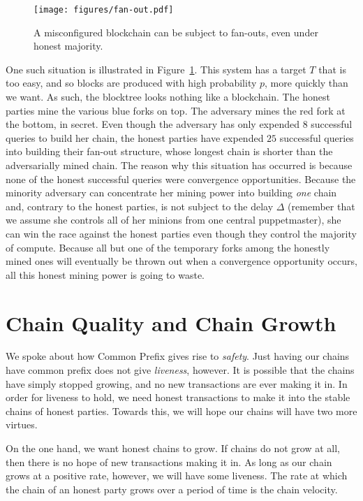 \begin{figure}[h]
    \centering
    \texttt{[image: figures/fan-out.pdf]}
    \caption{A misconfigured blockchain can be subject to fan-outs, even under honest majority.}
    \label{fig.fan-out}
\end{figure}

One such situation is illustrated in Figure~\ref{fig.fan-out}. This system has a target $T$
that is too easy, and so blocks are produced with high probability $p$, more quickly than we
want. As such, the blocktree looks nothing like a blockchain. The honest parties mine the
various blue forks on top. The adversary mines the red fork at the bottom, in secret.
Even though the adversary has only expended $8$ successful queries to build her chain,
the honest parties have expended $25$ successful queries into building their fan-out
structure, whose longest chain is shorter than the adversarially mined chain. The reason
why this situation has occurred is because none of the honest successful queries were
convergence opportunities. Because the minority adversary can concentrate her mining
power into building \emph{one} chain and, contrary to the honest parties, is not subject
to the delay $\Delta$ (remember that we assume she controls all of her minions from one
central puppetmaster), she can win the race against the honest parties even though they
control the majority of compute. Because all but one of the temporary forks among the
honestly mined ones will eventually be thrown out when a convergence opportunity occurs,
all this honest mining power is going to waste.

\section{Chain Quality and Chain Growth}

We spoke about how Common Prefix gives rise to \emph{safety}. Just having our chains
have common prefix does not give \emph{liveness}, however. It is possible that the chains
have simply stopped growing, and no new transactions are ever making it in. In order
for liveness to hold, we need honest transactions to make it into the stable chains
of honest parties. Towards this, we will hope our chains will have two more virtues.

On the one hand, we want honest chains to grow. If chains do not grow at all, then
there is no hope of new transactions making it in. As long as our chain grows
at a positive rate, however, we will have some liveness. The rate at which the
chain of an honest party grows over a period of time is the chain velocity.

